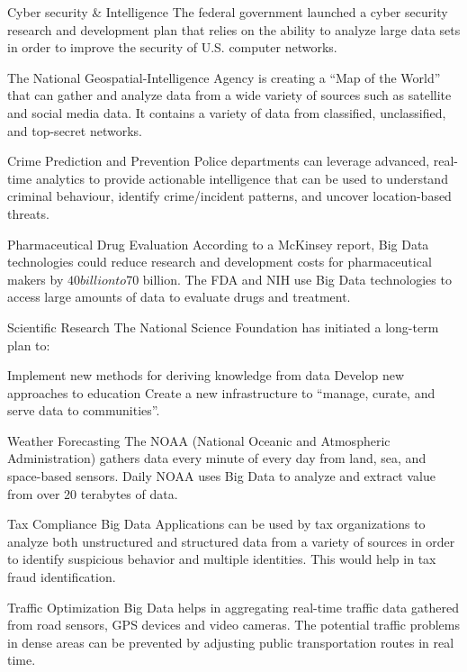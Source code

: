 Cyber security \& Intelligence
The federal government launched a cyber security research and development plan that relies on the ability to analyze large data sets in order to improve the security of U.S. computer networks.

The National Geospatial-Intelligence Agency is creating a “Map of the World” that can gather and analyze data from a wide variety of sources such as satellite and social media data. It contains a variety of data from classified, unclassified, and top-secret networks.

Crime Prediction and Prevention
Police departments can leverage advanced, real-time analytics to provide actionable intelligence that can be used to understand criminal behaviour, identify crime/incident patterns, and uncover location-based threats.

Pharmaceutical Drug Evaluation
According to a McKinsey report, Big Data technologies could reduce research and development costs for pharmaceutical makers by $40 billion to $70 billion. The FDA and NIH use Big Data technologies to access large amounts of data to evaluate drugs and treatment.

Scientific Research
The National Science Foundation has initiated a long-term plan to:

Implement new methods for deriving knowledge from data
Develop new approaches to education
Create a new infrastructure to “manage, curate, and serve data to communities”.

Weather Forecasting
The NOAA (National Oceanic and Atmospheric Administration) gathers data every minute of every day from land, sea, and space-based sensors. Daily NOAA uses Big Data to analyze and extract value from over 20 terabytes of data.

Tax Compliance
Big Data Applications can be used by tax organizations to analyze both unstructured and structured data from a variety of sources in order to identify suspicious behavior and multiple identities. This would help in tax fraud identification.

Traffic Optimization
Big Data helps in aggregating real-time traffic data gathered from road sensors, GPS devices and video cameras. The potential traffic problems in dense areas can be prevented by adjusting public transportation routes in real time.